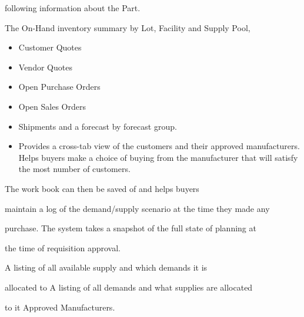 \documentclass[letterpaper,10pt,english]{sphinxmanual}
\begin{document}
following
\textbar{} information about the Part.

The On-Hand inventory summary by Lot, Facility and Supply Pool,
\begin{itemize}
\item {} 
Customer Quotes

\item {} 
Vendor Quotes

\item {} 
Open Purchase Orders

\item {} 
Open Sales Orders

\item {} 
Shipments and a forecast by forecast group.

\item {} 
Provides a cross-tab view of the customers and their approved
manufacturers. Helps buyers make a choice of buying from the
manufacturer that will satisfy the most number of customers.

\end{itemize}

\begin{DUlineblock}{0em}
\item[] The work book can then be saved of and helps buyers
\item[] maintain a log of the demand/supply scenario at the time they made any
\item[] purchase. The system takes a snapshot of the full state of planning at
\end{DUlineblock}

the time
\textbar{} of requisition approval.

\begin{DUlineblock}{0em}
\item[] A listing of all available supply and which demands it is
\item[] allocated to A listing of all demands and what supplies are allocated
\end{DUlineblock}

to
\textbar{} it Approved Manufacturers.
\end{document}
